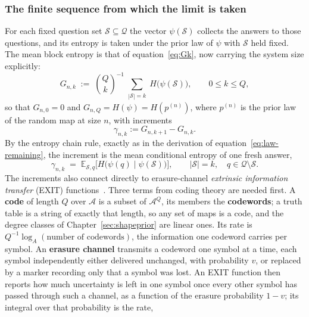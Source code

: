 \documentclass[11pt]{article}
\begin{document}
\subsubsection{The finite sequence from which the limit is taken}

For each fixed question set $\mathcal S \subseteq \mathcal Q$ the vector
$\psi(\mathcal S)$ collects the answers to those questions, and its
entropy is taken under the prior law of $\psi$ with $\mathcal S$ held
fixed. The mean block entropy is that of
equation~\eqref{eq:Gk}, now carrying the system size explicitly:
%
\begin{equation}
  G_{n,k}
  \;:=\; \binom{Q}{k}^{-1}
  \sum_{\substack{
    |\mathcal S| = k}} H\big(\psi(\mathcal S)\big),
  \qquad 0 \le k \le Q,
  \label{eq:Gnk}
\end{equation}
%
so that $G_{n,0} = 0$ and $G_{n,Q} = H(\psi) = H(p^{(n)})$, where
$p^{(n)}$ is the prior law of the random map at size $n$, with
increments 
%
\begin{equation}
\gamma_{n,k} := G_{n,k+1} - G_{n,k}.
\label{eq:teleskippie}
\end{equation}
%
By the entropy chain rule, exactly as in the derivation of
equation~\eqref{eq:law-remaining}, the increment is the mean
conditional entropy of one fresh answer,
%
\begin{equation}
  \gamma_{n,k}
  \;=\; \mathbb E_{\mathcal S, q}
  \big[H\big(\psi(q)\mid\psi(\mathcal S)\big)\big],
  \qquad
  |\mathcal S| = k,
  \quad q \in \mathcal Q \setminus \mathcal S.
  \label{eq:gammank}
\end{equation}
%
The increments also connect directly to erasure-channel
\emph{extrinsic information transfer} (EXIT) functions~\cite{ashikhmin04,richardsonurbanke08}.
Three terms from coding theory are needed first. A \textbf{code} of
length $Q$ over $\mathcal A$ is a subset of $\mathcal A^{Q}$, its
members the \textbf{codewords}; a truth table is a string of exactly
that length, so any set of maps is a code, and the degree classes of
Chapter~\ref{sec:shapeprior} are linear ones. Its rate is
$Q^{-1}\log_A(\text{number of codewords})$, the information one
codeword carries per symbol. An \textbf{erasure channel} transmits a
codeword one symbol at a time, each symbol independently either
delivered unchanged, with probability $v$, or replaced by a marker
recording only that a symbol was lost. An EXIT function then reports
how much uncertainty is left in one symbol once every other symbol has
passed through such a channel, as a function of the erasure
probability $1-v$; its integral over that probability is the rate,
\end{document}
